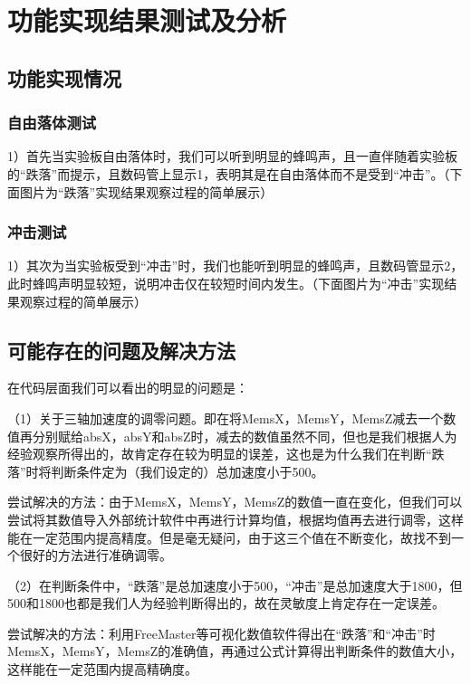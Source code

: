 \section{功能实现结果测试及分析}
\subsection{功能实现情况}
\subsubsection{自由落体测试}
\par{1）首先当实验板自由落体时，我们可以听到明显的蜂鸣声，且一直伴随着实验板的“跌落”而提示，且数码管上显示1，表明其是在自由落体而不是受到“冲击”。（下面图片为“跌落”实现结果观察过程的简单展示）}



\subsubsection{冲击测试}
\par{1）其次为当实验板受到“冲击”时，我们也能听到明显的蜂鸣声，且数码管显示2，此时蜂鸣声明显较短，说明冲击仅在较短时间内发生。（下面图片为“冲击”实现结果观察过程的简单展示）}



\subsection{可能存在的问题及解决方法}
\par{在代码层面我们可以看出的明显的问题是：}
\par{（1）关于三轴加速度的调零问题。即在将MemsX，MemsY，MemsZ减去一个数值再分别赋给absX，absY和absZ时，减去的数值虽然不同，但也是我们根据人为经验观察所得出的，故肯定存在较为明显的误差，这也是为什么我们在判断“跌落”时将判断条件定为（我们设定的）总加速度小于500。}
\par{尝试解决的方法：由于MemsX，MemsY，MemsZ的数值一直在变化，但我们可以尝试将其数值导入外部统计软件中再进行计算均值，根据均值再去进行调零，这样能在一定范围内提高精度。但是毫无疑问，由于这三个值在不断变化，故找不到一个很好的方法进行准确调零。}
\par{（2）在判断条件中，“跌落”是总加速度小于500，“冲击”是总加速度大于1800，但500和1800也都是我们人为经验判断得出的，故在灵敏度上肯定存在一定误差。}
\par{尝试解决的方法：利用FreeMaster等可视化数值软件得出在“跌落”和“冲击”时MemsX，MemsY，MemsZ的准确值，再通过公式计算得出判断条件的数值大小，这样能在一定范围内提高精确度。}

